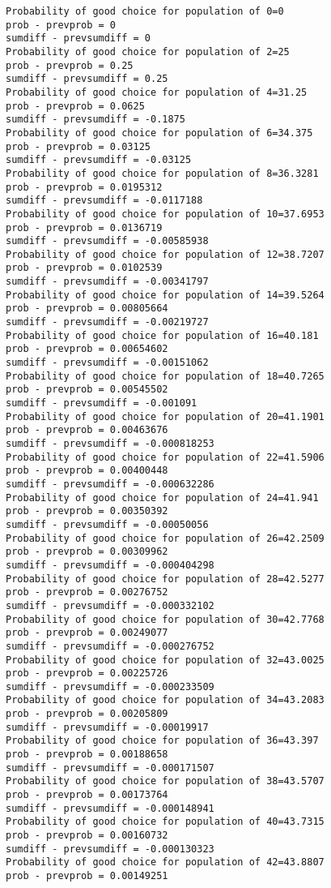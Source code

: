 \documentclass[11pt,onecolumn]{article}
\begin{document}
\begin{verbatim}
Probability of good choice for population of 0=0
prob - prevprob = 0
sumdiff - prevsumdiff = 0
Probability of good choice for population of 2=25
prob - prevprob = 0.25
sumdiff - prevsumdiff = 0.25
Probability of good choice for population of 4=31.25
prob - prevprob = 0.0625
sumdiff - prevsumdiff = -0.1875
Probability of good choice for population of 6=34.375
prob - prevprob = 0.03125
sumdiff - prevsumdiff = -0.03125
Probability of good choice for population of 8=36.3281
prob - prevprob = 0.0195312
sumdiff - prevsumdiff = -0.0117188
Probability of good choice for population of 10=37.6953
prob - prevprob = 0.0136719
sumdiff - prevsumdiff = -0.00585938
Probability of good choice for population of 12=38.7207
prob - prevprob = 0.0102539
sumdiff - prevsumdiff = -0.00341797
Probability of good choice for population of 14=39.5264
prob - prevprob = 0.00805664
sumdiff - prevsumdiff = -0.00219727
Probability of good choice for population of 16=40.181
prob - prevprob = 0.00654602
sumdiff - prevsumdiff = -0.00151062
Probability of good choice for population of 18=40.7265
prob - prevprob = 0.00545502
sumdiff - prevsumdiff = -0.001091
Probability of good choice for population of 20=41.1901
prob - prevprob = 0.00463676
sumdiff - prevsumdiff = -0.000818253
Probability of good choice for population of 22=41.5906
prob - prevprob = 0.00400448
sumdiff - prevsumdiff = -0.000632286
Probability of good choice for population of 24=41.941
prob - prevprob = 0.00350392
sumdiff - prevsumdiff = -0.00050056
Probability of good choice for population of 26=42.2509
prob - prevprob = 0.00309962
sumdiff - prevsumdiff = -0.000404298
Probability of good choice for population of 28=42.5277
prob - prevprob = 0.00276752
sumdiff - prevsumdiff = -0.000332102
Probability of good choice for population of 30=42.7768
prob - prevprob = 0.00249077
sumdiff - prevsumdiff = -0.000276752
Probability of good choice for population of 32=43.0025
prob - prevprob = 0.00225726
sumdiff - prevsumdiff = -0.000233509
Probability of good choice for population of 34=43.2083
prob - prevprob = 0.00205809
sumdiff - prevsumdiff = -0.00019917
Probability of good choice for population of 36=43.397
prob - prevprob = 0.00188658
sumdiff - prevsumdiff = -0.000171507
Probability of good choice for population of 38=43.5707
prob - prevprob = 0.00173764
sumdiff - prevsumdiff = -0.000148941
Probability of good choice for population of 40=43.7315
prob - prevprob = 0.00160732
sumdiff - prevsumdiff = -0.000130323
Probability of good choice for population of 42=43.8807
prob - prevprob = 0.00149251

\end{verbatim}
\end{document}
